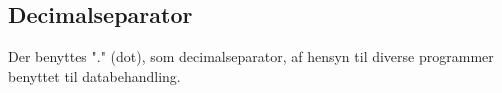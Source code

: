 \subsection*{Decimalseparator}
Der benyttes "." (dot), som decimalseparator, af hensyn til diverse programmer benyttet til databehandling.
%
